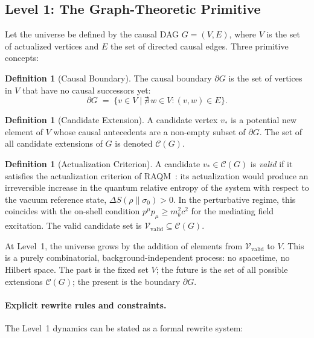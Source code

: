 \documentclass[11pt,a4paper]{article}
\theoremstyle{plain}
\theoremstyle{definition}
\newtheorem{definition}[theorem]{Definition}
\theoremstyle{remark}
\newcommand{\Vvalid}{\mathcal{V}_{\mathrm{valid}}}
\begin{document}
\subsection{Level 1: The Graph-Theoretic Primitive}

Let the universe be defined by the causal DAG $G = (V, E)$, where $V$ is the
set of actualized vertices and $E$ the set of directed causal edges. Three
primitive concepts:

\begin{definition}[Causal Boundary]
The causal boundary $\partial G$ is the set of vertices in $V$ that have no
causal successors yet:
\begin{equation}
  \partial G \;=\; \{v \in V \mid \nexists\, w \in V : (v,w) \in E\}.
  \label{eq:boundary_v2}
\end{equation}
\end{definition}

\begin{definition}[Candidate Extension]
A candidate vertex $v_*$ is a potential new element of $V$ whose causal
antecedents are a non-empty subset of $\partial G$. The set of all candidate
extensions of $G$ is denoted $\mathcal{C}(G)$.
\end{definition}

\begin{definition}[Actualization Criterion]
A candidate $v_* \in \mathcal{C}(G)$ is \emph{valid} if it satisfies the
actualization criterion of RAQM~\citep{Sandeman2026a}: its actualization would
produce an irreversible increase in the quantum relative entropy of the system
with respect to the vacuum reference state, $\Delta S(\rho\|\sigma_0) > 0$.
In the perturbative regime, this coincides with the on-shell condition
$p^\mu p_\mu \geq m_b^2 c^2$ for the mediating field excitation. The valid
candidate set is $\Vvalid \subseteq \mathcal{C}(G)$.
\end{definition}

At Level~1, the universe grows by the addition of elements from $\Vvalid$ to
$V$. This is a purely combinatorial, background-independent process: no
spacetime, no Hilbert space. The past is the fixed set $V$; the future is the
set of all possible extensions $\mathcal{C}(G)$; the present is the boundary
$\partial G$.
\paragraph{Explicit rewrite rules and constraints.}
The Level~1 dynamics can be stated as a formal rewrite system:
\end{document}
